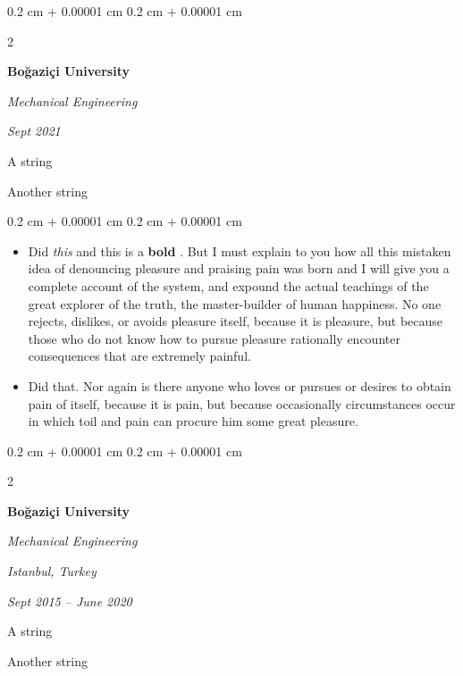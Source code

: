 \documentclass[10pt, letterpaper]{article}
\newenvironment{summary}{
    \begin{description}[
        topsep=0.10 cm,
        parsep=0.10 cm,
        partopsep=0pt,
        itemsep=0pt,
        leftmargin=0.4 cm + 10pt
    ]
}{
    \end{description}
} %
\newenvironment{highlights}{
    \begin{itemize}[
        topsep=0.10 cm,
        parsep=0.10 cm,
        partopsep=0pt,
        itemsep=0pt,
        leftmargin=0.4 cm + 10pt
    ]
}{
    \end{itemize}
} %
\newenvironment{onecolentry}{
    \begin{adjustwidth}{
        0.2 cm + 0.00001 cm
    }{
        0.2 cm + 0.00001 cm
    }
}{
    \end{adjustwidth}
} %
\newenvironment{twocolentry}[2][]{
    \onecolentry
    \def\secondColumn{#2}
    \setcolumnwidth{\fill, 4.5 cm}
    \begin{paracol}{2}
}{
    \switchcolumn \raggedleft \secondColumn
    \end{paracol}
    \endonecolentry
} %
\let\hrefWithoutArrow\href
\renewcommand{\href}[2]{\hrefWithoutArrow{#1}{\ifthenelse{\equal{#2}{}}{ }{#2 }\raisebox{.15ex}{\footnotesize \faExternalLink*}}}
\begin{document}
        \begin{twocolentry}{
            
            
        \textit{Sept 2021}}
            \textbf{Boğaziçi University}

            \textit{Mechanical Engineering}
        \end{twocolentry}
            \begin{summary}
                \item A string
                \item Another string
            \end{summary}
        \vspace{0.10 cm}
        \begin{onecolentry}
            \begin{highlights}
                \item Did \textit{this} and this is a \textbf{bold} \href{https://example.com}{link}. But I must explain to you how all this mistaken idea of denouncing pleasure and praising pain was born and I will give you a complete account of the system, and expound the actual teachings of the great explorer of the truth, the master-builder of human happiness. No one rejects, dislikes, or avoids pleasure itself, because it is pleasure, but because those who do not know how to pursue pleasure rationally encounter consequences that are extremely painful.
                \item Did that. Nor again is there anyone who loves or pursues or desires to obtain pain of itself, because it is pain, but because occasionally circumstances occur in which toil and pain can procure him some great pleasure.
            \end{highlights}
        \end{onecolentry}


        \vspace{0.2 cm}

        \begin{twocolentry}{
        \textit{Istanbul, Turkey}    
            
        \textit{Sept 2015 – June 2020}}
            \textbf{Boğaziçi University}

            \textit{Mechanical Engineering}
        \end{twocolentry}
            \begin{summary}
                \item A string
                \item Another string
            \end{summary}
\end{document}
